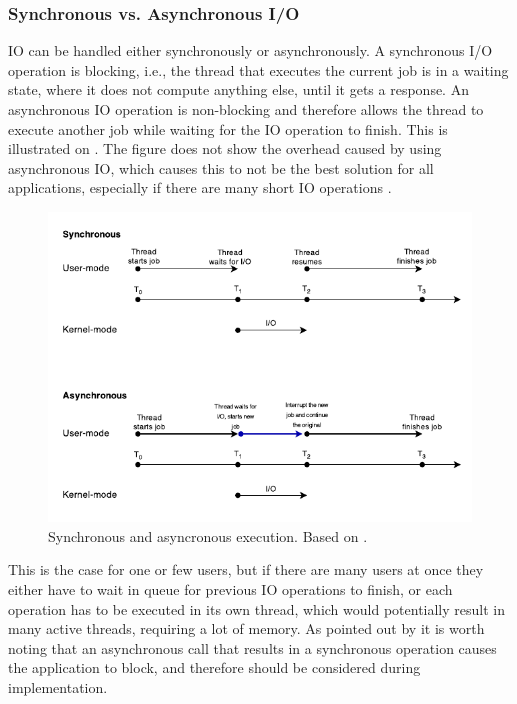 \subsubsection{Synchronous vs. Asynchronous I/O}\label{subsubsec:sync}
IO can be handled either synchronously or asynchronously. A synchronous I/O operation is blocking, i.e., the thread that executes the current job is in a waiting state, where it does not compute anything else, until it gets a response. An asynchronous IO operation is non-blocking and therefore allows the thread to execute another job while waiting for the IO operation to finish. This is illustrated on . The figure does not show the overhead caused by using asynchronous IO, which causes this to not be the best solution for all applications, especially if there are many short IO operations \cite{ms-syn-asyn}.

\begin{figure}[H]
  \centering
  \includegraphics[scale=1.2]{billeder/sync-async.pdf}  
  \caption{Synchronous and asyncronous execution. Based on \cite{ms-syn-asyn}.}
  \label{fig:syncasync}
\end{figure}

This is the case for one or few users, but if there are many users at once they either have to wait in queue for previous IO operations to finish, or each operation has to be executed in its own thread, which would potentially result in many active threads, requiring a lot of memory.  As pointed out by \citet{amir} it is worth noting that an asynchronous call that results in a synchronous operation causes the application to block, and therefore should be considered during implementation.

